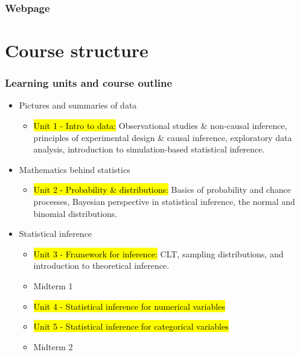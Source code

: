 \documentclass[11pt,containsverbatim,handout,xcolor=xelatex,dvipsnames,table]{beamer}
\begin{document}

\begin{frame}
\frametitle{Webpage}

\vfill

\centering
{\Large 
\webURL{\CourseSite} 
}

\end{frame}


\section{Course structure}


\begin{frame}[shrink]
\frametitle{Learning units and course outline}

\begin{itemize}

\item Pictures and summaries of data
\begin{itemize}
\item \hl{Unit 1 - Intro to data:} Observational studies \& non-causal inference, 
principles of experimental design \& causal inference, exploratory data analysis, 
introduction to simulation-based statistical inference.
\end{itemize}

\item Mathematics behind statistics
\begin{itemize}
\item \hl{Unit 2 - Probability \& distributions:} Basics of probability and chance 
processes, Bayesian perspective in statistical inference, the normal and binomial 
distributions.
\end{itemize}

\item Statistical inference
\begin{itemize}
\item \hl{Unit 3 - Framework for inference:} CLT, sampling distributions, and 
introduction to theoretical inference.
\item Midterm 1
\item \hl{Unit 4 - Statistical inference for numerical variables}
\item \hl{Unit 5 - Statistical inference for categorical variables}
\item Midterm 2
\end{itemize}


\end{itemize}
\end{frame}
\end{document}
